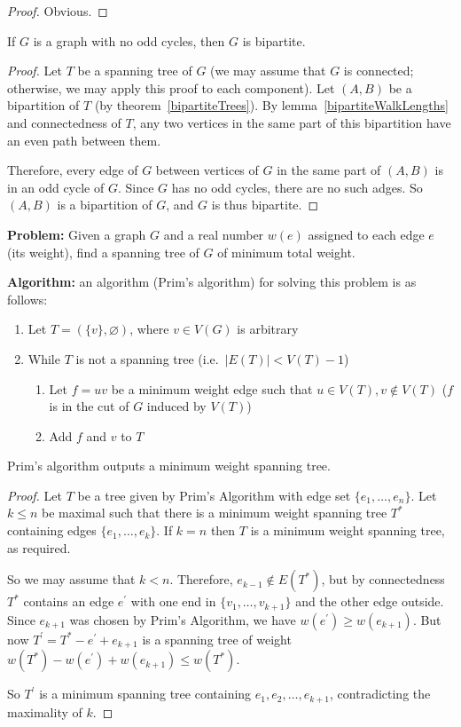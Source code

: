 \documentclass[12pt]{article}
\begin{document}
\begin{proof}
Obvious.
\end{proof}

\begin{lemma}
If $G$ is a graph with no odd cycles, then $G$ is bipartite.
\end{lemma}

\begin{proof}
Let $T$ be a spanning tree of $G$ (we may assume that $G$ is connected; otherwise, we may apply this proof to each component). Let $(A,B)$ be a bipartition of $T$ (by theorem~\ref{bipartiteTrees}). By lemma~\ref{bipartiteWalkLengths} and connectedness of $T$, any two vertices in the same part of this bipartition have an even path between them.

Therefore, every edge of $G$ between vertices of $G$ in the same part of $(A,B)$ is in an odd cycle of $G$. Since $G$ has no odd cycles, there are no such adges. So $(A,B)$ is a bipartition of $G$, and $G$ is thus bipartite.
\end{proof}

{\bf Problem:} Given a graph $G$ and a real number $w(e)$ assigned to each edge $e$ (its weight), find a spanning tree of $G$ of minimum total weight.

{\bf Algorithm:} an algorithm (Prim's algorithm) for solving this problem is as follows:
\begin{enumerate}
\item Let $T = (\{v\},\varnothing)$, where $v \in V(G)$ is arbitrary
\item While $T$ is not a spanning tree (i.e.\ $|E(T)| < V(T) -1$)
\begin{enumerate}
\item Let $f=uv$ be a minimum weight edge such that $u \in V(T), v \notin V(T)$ ($f$ is in the cut of $G$ induced by $V(T)$)
\item Add $f$ and $v$ to $T$
\end{enumerate}
\end{enumerate}

\begin{theorem}
Prim's algorithm outputs a minimum weight spanning tree.
\end{theorem}

\begin{proof}
Let $T$ be a tree given by Prim's Algorithm with edge set $\{e_1, \dots, e_n\}$. Let $k \leq n$ be maximal such that there is a minimum weight spanning tree $T^*$ containing edges $\{e_1, \dots, e_k\}$. If $k=n$ then $T$ is a minimum weight spanning tree, as required.

So we may assume that $k < n$. Therefore, $e_{k-1} \notin E(T^*)$, but by connectedness $T^*$ contains an edge $e^\prime$ with one end in $\{v_1, \dots, v_{k+1}\}$ and the other edge outside. Since $e_{k+1}$ was chosen by Prim's Algorithm, we have $w(e^\prime) \geq w(e_{k+1})$. But now $T^\prime = T^* - e^\prime + e_{k+1}$ is a spanning tree of weight $w(T^*) - w(e^\prime) + w(e_{k+1}) \leq w(T^*)$.

So $T^\prime$ is a minimum spanning tree containing $e_1, e_2, \dots, e_{k+1}$, contradicting the maximality of $k$.
\end{proof}
\end{document}
